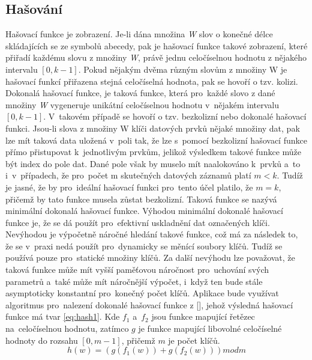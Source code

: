 \documentclass[11pt,twoside,a4paper]{book}
\begin{document}
\subsection {\label{SEC:hashP} Hašování}
Hašovací funkce je zobrazení. Je-li dána množina \textit{W} slov o konečné délce skládajících se ze symbolů abecedy, pak je hašovací funkce takové zobrazení, které přiřadí každému slovu z množiny \textit{W}, právě jednu celočíselnou hodnotu z nějakého intervalu $[0,k-1]$. Pokud nějakým dvěma různým slovům z množiny W je hašovací funkcí přiřazena stejná celočíselná hodnota, pak se hovoří o tzv. kolizi.
Dokonalá hašovací funkce, je taková funkce, která pro~každé slovo z dané množiny \textit{W} vygeneruje unikátní celočíselnou hodnotu v~nějakém intervalu $[0,k-1]$. V~takovém případě se hovoří o tzv. bezkolizní nebo dokonalé hašovací funkci. Jsou-li slova z množiny W klíči datových prvků nějaké množiny dat, pak lze mít taková data uložená v~poli tak, že lze s~pomocí bezkolizní hašovací funkce přímo přistupovat k~jednotlivým prvkům, jelikož výsledkem takové funkce může být index do pole dat. Dané pole však by muselo mít naalokováno k~prvků a~to i~v~případech, že pro~počet m skutečných datových záznamů platí $m<k$. Tudíž je jasné, že by pro~ideální hašovací funkci pro~tento účel platilo, že $m=k$, přičemž by tato funkce musela zůstat bezkolizní. Taková funkce se nazývá minimální dokonalá hašovací funkce.
Výhodou minimální dokonalé hašovací funkce je, že se dá použít pro~efektivní uskladnění dat označených klíči. Nevýhodou je výpočetně náročné hledání takové funkce, což má za následek to, že se v~praxi nedá použít pro~dynamicky se měnící soubory klíčů. Tudíž se používá pouze pro~statické množiny klíčů. Za další nevýhodu lze považovat, že taková funkce může mít vyšší paměťovou náročnost pro~uchování svých parametrů a~také může mít náročnější výpočet, i~když ten bude stále asymptoticky konstantní pro~konečný počet klíčů.
Aplikace bude využívat algoritmus pro~nalezení dokonalé hašovací funkce z [\cite{bib:hashPerfect}], jehož výsledná hašovací funkce má tvar \ref{eq:hash1}.
Kde $f_1$ a~$f_2$ jsou funkce mapující řetězec na~celočíselnou hodnotu, zatímco $g$ je funkce mapující libovolné celočíselné hodnoty do rozsahu $[0,m-1]$, přičemž $m$ je počet klíčů. 
\begin{equation} \label{eq:hash1}
h(w) = (g(f_1(w))+g(f_2(w))) mod m
\end{equation}
\end{document}
